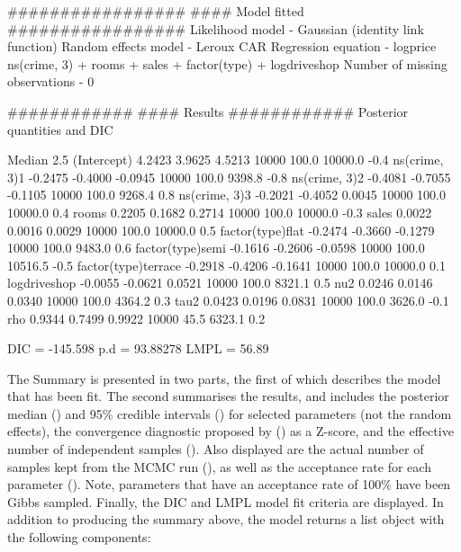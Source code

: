 \documentclass[article,shortnames,nojss]{jss}
\begin{document}
\begin{CodeOutput}
#################
#### Model fitted
#################
Likelihood model - Gaussian (identity link function) 
Random effects model - Leroux CAR
Regression equation - logprice ~ ns(crime, 3) + rooms + sales + factor(type) + logdriveshop
Number of missing observations - 0

############
#### Results
############
Posterior quantities and DIC

                     Median    2.5%
(Intercept)          4.2423  3.9625  4.5213    10000    100.0     10000.0        -0.4
ns(crime, 3)1       -0.2475 -0.4000 -0.0945    10000    100.0      9398.8        -0.8
ns(crime, 3)2       -0.4081 -0.7055 -0.1105    10000    100.0      9268.4         0.8
ns(crime, 3)3       -0.2021 -0.4052  0.0045    10000    100.0     10000.0         0.4
rooms                0.2205  0.1682  0.2714    10000    100.0     10000.0        -0.3
sales                0.0022  0.0016  0.0029    10000    100.0     10000.0         0.5
factor(type)flat    -0.2474 -0.3660 -0.1279    10000    100.0      9483.0         0.6
factor(type)semi    -0.1616 -0.2606 -0.0598    10000    100.0     10516.5        -0.5
factor(type)terrace -0.2918 -0.4206 -0.1641    10000    100.0     10000.0         0.1
logdriveshop        -0.0055 -0.0621  0.0521    10000    100.0      8321.1         0.5
nu2                  0.0246  0.0146  0.0340    10000    100.0      4364.2         0.3
tau2                 0.0423  0.0196  0.0831    10000    100.0      3626.0        -0.1
rho                  0.9344  0.7499  0.9922    10000     45.5      6323.1         0.2

DIC =  -145.598       p.d =  93.88278       LMPL =  56.89 
\end{CodeOutput}


The Summary is presented in two parts, the first of which describes the model that has been fit. The second summarises the results, and includes the posterior median () and 95\% credible intervals () for selected parameters (not the random effects), the convergence diagnostic proposed by \cite{geweke1992} () as a Z-score, and the effective number of independent samples (). Also displayed are the actual number of samples kept from the MCMC run  (), as well as the acceptance rate for each parameter (). Note, parameters that have an acceptance rate of 100\% have been Gibbs sampled. Finally, the DIC and LMPL  model fit criteria are displayed. In addition to producing the summary above, the model returns a list object with the following components:
\end{document}
